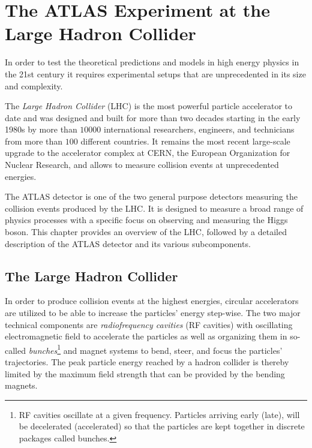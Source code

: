 
\chapter{The ATLAS Experiment at the Large Hadron Collider}
\label{chap:experiment}

In order to test the theoretical predictions and models in high energy physics in the 21st century it requires experimental setups that are unprecedented in its size and complexity.

The \emph{Large Hadron Collider} (LHC)  is the most powerful particle accelerator to date and was designed and built for more than two decades starting in the early 1980s by more than $10000$ international researchers, engineers, and technicians from more than $100$ different countries. It remains the most recent large-scale upgrade to the accelerator complex at CERN, the European Organization for Nuclear Research, and allows to measure collision events at unprecedented energies.

The ATLAS detector is one of the two general purpose detectors measuring the collision events produced by the LHC. It is designed to measure a broad range of physics processes with a specific focus on observing and measuring the Higgs boson. This chapter provides an overview of the LHC, followed by a detailed description of the ATLAS detector and its various subcomponents.


\section{The Large Hadron Collider}
In order to produce collision events at the highest energies, circular accelerators are utilized to be able to increase the particles' energy step-wise. The two major technical components are \emph{radiofrequency cavities} (RF cavities) with oscillating electromagnetic field to accelerate the particles as well as organizing them in so-called \emph{bunches}\footnote{RF cavities oscillate at a given frequency. Particles arriving early (late), will be decelerated (accelerated) so that the particles are kept together in discrete packages called bunches.} and magnet systems to bend, steer, and focus the particles' trajectories. The peak particle energy reached by a hadron collider is thereby limited by the maximum field strength that can be provided by the bending magnets.

